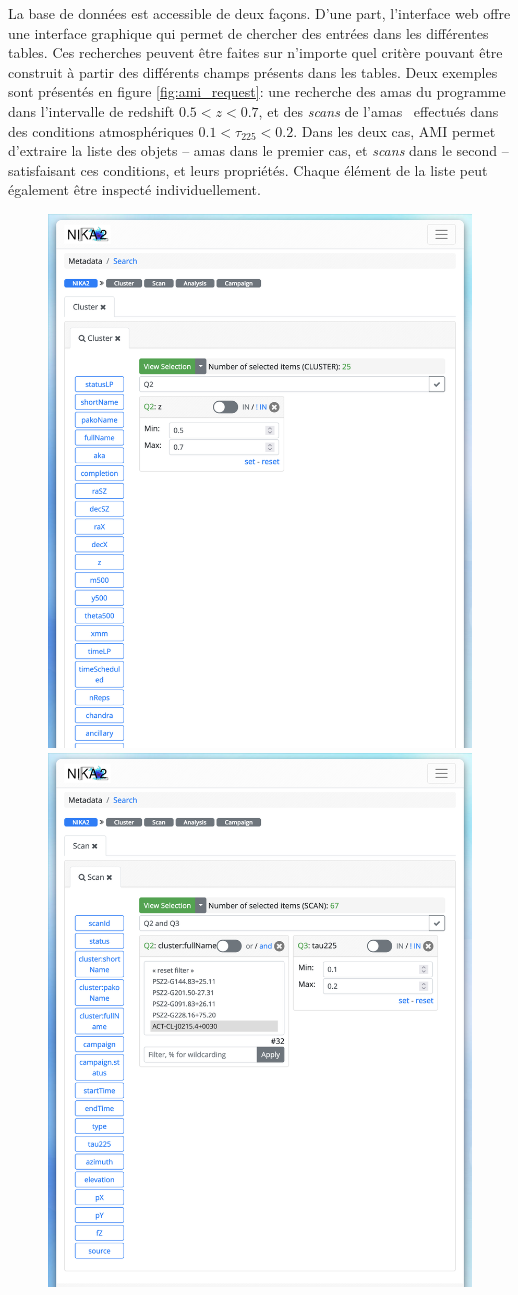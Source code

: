 La base de données est accessible de deux façons.
D'une part, l'interface web offre une interface graphique qui permet de chercher des entrées dans les différentes tables.
Ces recherches peuvent être faites sur n'importe quel critère pouvant être construit à partir des différents champs présents dans les tables.
Deux exemples sont présentés en figure \ref{fig:ami_request}: une recherche des amas du programme dans l'intervalle de redshift $0.5 < z < 0.7$, et des \textit{scans} de l'amas \act\ effectués dans des conditions atmosphériques $0.1 < \tau_{225} < 0.2$.
Dans les deux cas, AMI permet d'extraire la liste des objets -- amas dans le premier cas, et \textit{scans} dans le second -- satisfaisant ces conditions, et leurs propriétés.
Chaque élément de la liste peut également être inspecté individuellement.

\begin{figure}[t]
    \centering
    \includegraphics[width=.49\linewidth, trim={0 12cm 0 0}, clip]{Figures/Chap_nk/ami_query_1.png} \hfill
    \includegraphics[width=.49\linewidth, trim={0 12cm 0 0}, clip]{Figures/Chap_nk/ami_query_2.png}

\end{figure}
